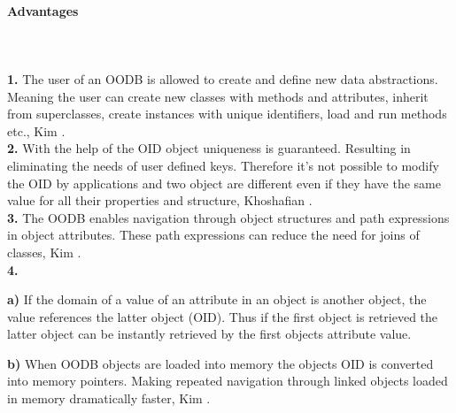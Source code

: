 \documentclass{cslthse-msc}
\begin{document}
\paragraph*{Advantages}\mbox{}\\\\
\textbf{1.} The user of an OODB is allowed to create and define new data abstractions. Meaning the user can create new classes with methods and attributes, inherit from superclasses, create instances with unique identifiers, load and run methods etc., Kim \cite{userdefinedabstractions}.\\ \textbf{2.} With the help of the OID object uniqueness is guaranteed. Resulting in eliminating the needs of user defined keys. Therefore it's not possible to modify the OID by applications and two object are different even if they have the same value for all their properties and structure, Khoshafian \cite{identity}.\\\textbf{3.} The OODB enables navigation through object structures and path expressions in object attributes. These path expressions can reduce the need for joins of classes, Kim \cite{userdefinedabstractions}.\\\textbf{4.}
\begin{addmargin}[1em]{0em}
\textbf{a)} If the domain of a value of an attribute in an object is another object, the value references the latter object (OID). Thus if the first object is retrieved the latter object can be instantly retrieved by the first objects attribute value.\\
\end{addmargin}
\begin{addmargin}[1em]{0em}
\textbf{b)} When OODB objects are loaded into memory the objects OID is converted into memory pointers. Making repeated navigation through linked objects loaded in memory dramatically faster, Kim \cite{userdefinedabstractions}.\\
\end{addmargin}
\end{document}
